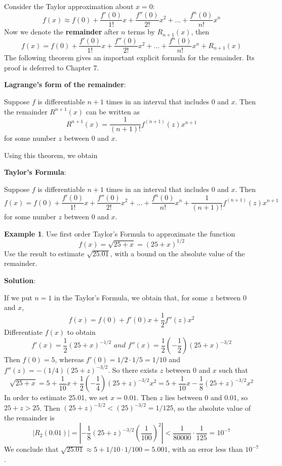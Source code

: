 \documentclass[10pt,a4paper]{book}
\theoremstyle{definition}\newtheorem{definition}{Definition}
\theoremstyle{definition}\newtheorem{fact}{Fact}
\theoremstyle{definition}\newtheorem{ex}{Ex.}
\theoremstyle{definition}\newtheorem{project}{Project}
\theoremstyle{definition}\newtheorem{problem}{Problem}
\theoremstyle{definition}\newtheorem{example}{Example}
\numberwithin{theorem}{chapter}
\numberwithin{corollary}{chapter}
\numberwithin{assumption}{chapter}
\numberwithin{definition}{chapter}
\numberwithin{prop}{chapter}
\numberwithin{notation}{chapter}
\numberwithin{problem}{chapter}
\numberwithin{example}{chapter}
\numberwithin{fact}{chapter}
\numberwithin{ex}{chapter}
\begin{document}
	Consider the Taylor approximation about $x = 0$:
	$$f(x) \approx f(0) + \frac{f'(0)}{1!}x + \frac{f''(0)}{2!}x^2 + \dots + \frac{f^{n}(0)}{n!}x^n$$
	Now we denote the \textbf{remainder} after $n$ terms by $R_{n+1}(x)$, then
	$$f(x) = f(0) + \frac{f'(0)}{1!}x + \frac{f''(0)}{2!}x^2 + \dots + \frac{f^{n}(0)}{n!}x^n + R_{n+1}(x)$$
	The following theorem gives an important explicit formula for the remainder. Its proof is deferred to Chapter 7.
	
	\textbf{Lagrange's form of the remainder}:
	
	Suppose $f$ is differentiable $n + 1$ times in an interval that includes 0 and $x$. Then the remainder $R^{n+1}(x)$ can be written as
	$$R^{n+1}(x) = \frac{1}{(n+1)!}f^{(n+1)}(z)x^{n+1}$$
	for some number $z$ between 0 and $x$.
	
	Using this theorem, we obtain
	
	\textbf{Taylor's Formula}:
	
	Suppose $f$ is differentiable $n + 1$ times in an interval that includes 0 and $x$. Then
	$$f(x) = f(0) + \frac{f'(0)}{1!}x + \frac{f''(0)}{2!}x^2 + \dots + \frac{f^{n}(0)}{n!}x^n + \frac{1}{(n+1)!}f^{(n+1)}(z)x^{n+1}$$
	for some number $z$ between 0 and $x$.
	
	\begin{example}
		Use first order Taylor's Formula to approximate the function
		$$f(x) = \sqrt{25+x} = (25+x)^{1/2}$$
		Use the result to estimate $\sqrt{25.01}$, with a bound on the absolute value of the remainder.
		
		\textbf{Solution}:
		
		If we put $n=1$ in the Taylor's Formula, we obtain that, for some $z$ between 0 and $x$,
		$$f(x) = f(0) + f'(0)x + \frac{1}{2} f''(z)x^2$$
		Differentiate $f(x)$ to obtain
		$$f'(x) = \frac{1}{2}(25+x)^{-1/2} \,\,and\,\, f''(x)=\frac{1}{2}\left(-\frac{1}{2}\right)(25+x)^{-3/2}$$
		Then $f(0) = 5$, whereas $f'(0) = 1/2 \cdot 1/5 = 1/10$ and $f''(z) = -(1/4)(25 + z)^{-3/2}$. So there exists $z$ between 0 and $x$ such that
		$$\sqrt{25+x}= 5 + \frac{1}{10}x + \frac{1}{2}\left(-\frac{1}{4}\right)(25+z)^{-3/2}x^2 = 5 + \frac{1}{10}x - \frac{1}{8}(25+z)^{-3/2}x^2$$
		In order to estimate 25.01, we set $x = 0.01$. Then $z$ lies between 0 and 0.01, so $25 + z > 25$. Then $(25 + z)^{-3/2} < (25)^{-3/2} = 1/125$, so the absolute value of the remainder is
		$$|R_2(0.01)| = \left| -\frac{1}{8}(25+z)^{-3/2}\left(\frac{1}{100}\right)^2 \right| < \frac{1}{80000} \cdot \frac{1}{125} = 10^{-7}$$
		We conclude that $\sqrt{25.01} \approx 5 + 1/10 \cdot 1/100 = 5.001$, with an error less than $10^{-7}$. 
	\end{example}
	
\end{document}

